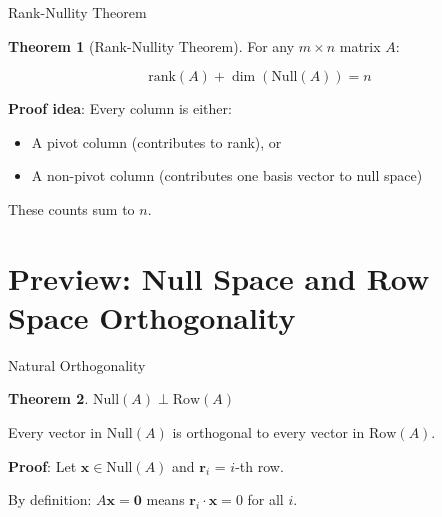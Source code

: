 \documentclass[10pt]{beamer}
\theoremstyle{definition}
\newtheorem{thm}{Theorem}[section]
\newcommand{\x}[1]{\alert{\textbf{#1}}}
\begin{document}
\begin{frame}{Rank-Nullity Theorem}

\begin{thm}[Rank-Nullity Theorem]
For any $m \times n$ matrix $A$:

$$\boxed{\text{rank}(A) + \dim(\text{Null}(A)) = n}$$
\end{thm}

\vspace{1em}

\x{Proof idea}: Every column is either:
\begin{itemize}
\item A pivot column (contributes to rank), or
\item A non-pivot column (contributes one basis vector to null space)
\end{itemize}

These counts sum to $n$.

\end{frame}

\section{Preview: Null Space and Row Space Orthogonality}

\begin{frame}{Natural Orthogonality}

\begin{thm}
$\text{Null}(A) \perp \text{Row}(A)$

Every vector in $\text{Null}(A)$ is orthogonal to every vector in $\text{Row}(A)$.
\end{thm}

\vspace{1em}

\x{Proof}: Let $\mathbf{x} \in \text{Null}(A)$ and $\mathbf{r}_i$ = $i$-th row.

By definition: $A\mathbf{x} = \mathbf{0}$ means $\mathbf{r}_i \cdot \mathbf{x} = 0$ for all $i$.

\end{frame}
\end{document}
